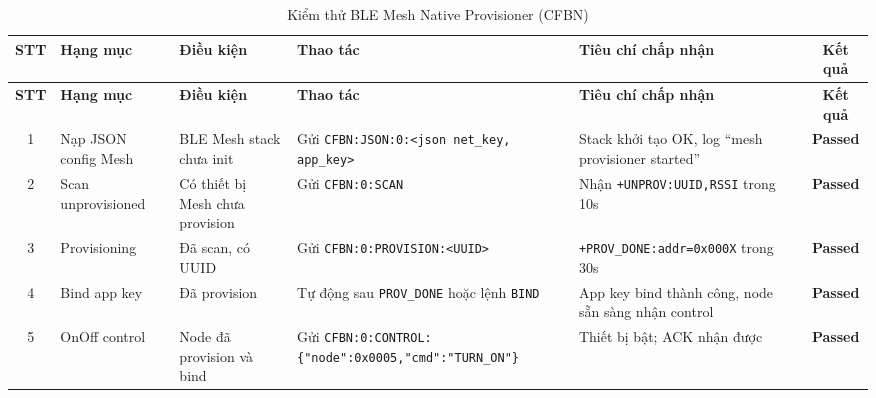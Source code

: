         \begin{longtable}{|c|p{2cm}|p{2cm}|p{4cm}|p{4cm}|c|}
            \caption{Kiểm thử BLE Mesh Native Provisioner (CFBN)}
            \label{tab:test_ble_mesh_native} \\
            \hline
            \textbf{STT} & \textbf{Hạng mục} & \textbf{Điều kiện} & \textbf{Thao tác} & \textbf{Tiêu chí chấp nhận} & \textbf{Kết quả} \\ \hline
            \endfirsthead
            \hline
            \textbf{STT} & \textbf{Hạng mục} & \textbf{Điều kiện} & \textbf{Thao tác} & \textbf{Tiêu chí chấp nhận} & \textbf{Kết quả} \\ \hline
            \endhead
            \hline
            \endfoot
            \endlastfoot
        
            1 & Nạp JSON config Mesh & BLE Mesh stack chưa init & Gửi \texttt{CFBN:JSON:0:}\newline\texttt{<json net\_key, app\_key>} & Stack khởi tạo OK, log ``mesh provisioner started'' & \textcolor{modern_blue}{\textbf{Passed}} \\ \hline
        
            2 & Scan unprovisioned & Có thiết bị Mesh chưa provision & Gửi \texttt{CFBN:0:SCAN} & Nhận \texttt{+UNPROV:}\newline\texttt{UUID,RSSI} trong 10s & \textcolor{modern_blue}{\textbf{Passed}} \\ \hline
        
            3 & Provisioning & Đã scan, có UUID & Gửi \texttt{CFBN:0:}\newline\texttt{PROVISION:<UUID>} & \texttt{+PROV\_DONE:}\newline\texttt{addr=0x000X} trong 30s & \textcolor{modern_blue}{\textbf{Passed}} \\ \hline
        
            4 & Bind app key & Đã provision & Tự động sau \texttt{PROV\_DONE} hoặc lệnh \texttt{BIND} & App key bind thành công, node sẵn sàng nhận control & \textcolor{modern_blue}{\textbf{Passed}} \\ \hline
        
            5 & OnOff control & Node đã provision và bind & Gửi \texttt{CFBN:0:CONTROL:}\newline\texttt{\{"node":0x0005,}\newline\texttt{"cmd":"TURN\_ON"\}} & Thiết bị bật; ACK nhận được & \textcolor{modern_blue}{\textbf{Passed}} \\ \hline
        

\end{longtable}
